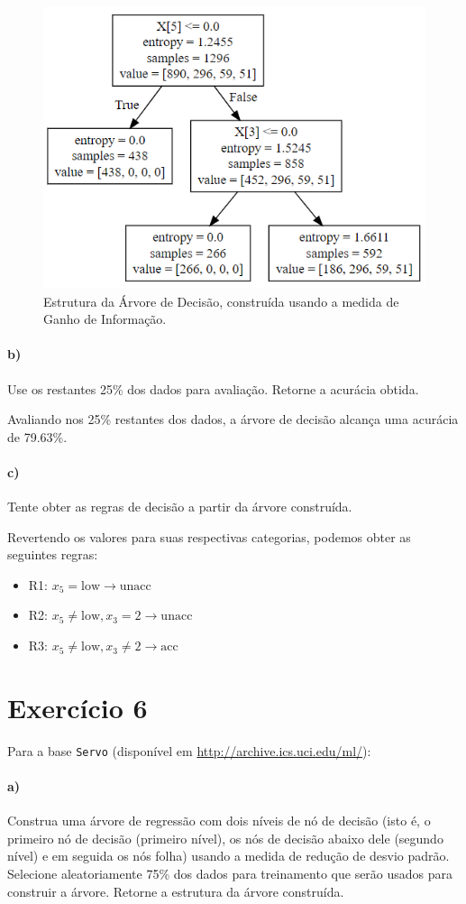 \documentclass{article}
\begin{document}
\begin{figure}[h]
	\centering
	\includegraphics[width=0.5\linewidth]{exercicio5-a.png}
	\caption{Estrutura da Árvore de Decisão, construída usando a medida de Ganho de Informação.}
	\label{fig:exercicio5-a}
\end{figure}

\paragraph{b)} Use os restantes 25\% dos dados para avaliação. Retorne a acurácia obtida.

Avaliando nos 25\% restantes dos dados, a árvore de decisão alcança uma acurácia de 79.63\%.

\paragraph{c)} Tente obter as regras de decisão a partir da árvore construída.

Revertendo os valores para suas respectivas categorias, podemos obter as seguintes regras:

\begin{itemize}
	\item R1: $x_5 = \text{low} \rightarrow \text{unacc}$
	\item R2: $x_5 \neq \text{low}, x_3 = 2 \rightarrow \text{unacc}$
	\item R3: $x_5 \neq \text{low}, x_3 \neq 2 \rightarrow \text{acc}$
\end{itemize}

\section{Exercício 6}

Para a base \texttt{Servo} (disponível em \url{http://archive.ics.uci.edu/ml/}):

\paragraph{a)} Construa uma árvore de regressão com dois níveis de nó de decisão (isto é, o primeiro nó de decisão (primeiro nível), os nós de decisão abaixo dele (segundo nível) e em seguida os nós folha) usando a medida de redução de desvio padrão. Selecione aleatoriamente 75\% dos dados para treinamento que serão usados para construir a árvore. Retorne a estrutura da árvore construída.
\end{document}
